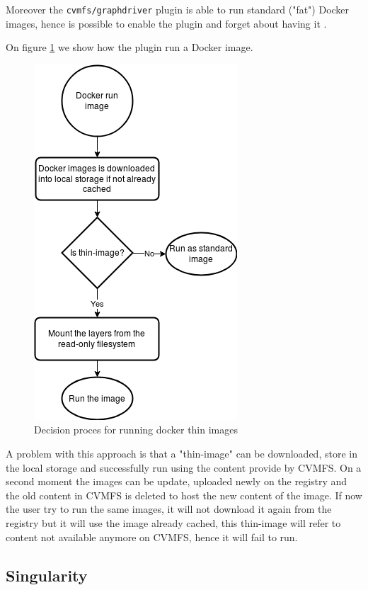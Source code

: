 Moreover the \texttt{cvmfs/graphdriver} plugin is able to run standard ("fat")
Docker images, hence is possible to enable the plugin and forget about having
it \cite{graphdriver-plugin}.

On figure \ref{fig:flowchart-run-thin-image} we show how the plugin run a
Docker image. 

\begin{figure}
\includegraphics{gfx/RunThinImages}
\caption{Decision proces for running docker thin images}
\label{fig:flowchart-run-thin-image}
\end{figure}

A problem with this approach is that a "thin-image" can be downloaded, store in
the local storage and successfully run using the content provide by CVMFS. On a
second moment the images can be update, uploaded newly on the registry and the
old content in CVMFS is deleted to host the new content of the image. If now
the user try to run the same images, it will not download it again from the
registry but it will use the image already cached, this thin-image will refer
to content not available anymore on CVMFS, hence it will fail to run.

\subsection{Singularity}

